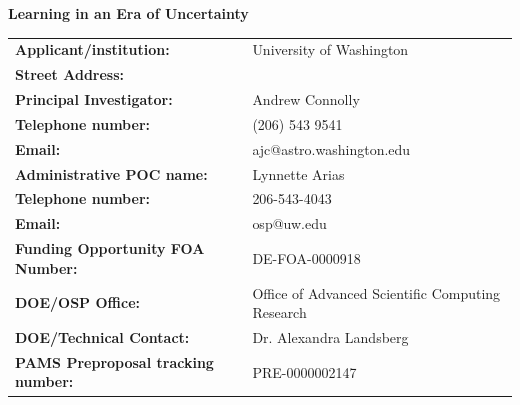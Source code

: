 \documentclass[prd,nofootbib,floatfix,11pt,tightenlines]{revtex4}
\begin{document}
 

\begin{center}
{\bf \Large Learning in an Era of Uncertainty}
\end{center}

\vspace{1cm}

\noindent
\begin{tabular}{ll}
{\bf Applicant/institution: } & University of Washington\\
{\bf Street Address: } & \\
{\bf Principal Investigator: } &Andrew Connolly \\
{\bf Telephone number: } & (206) 543 9541 \\
{\bf Email: } & ajc@astro.washington.edu \\
{\bf Administrative POC name:} & Lynnette Arias\\
{\bf Telephone number:} & 206-543-4043\\
{\bf Email:} & osp@uw.edu\\
{\bf Funding Opportunity FOA Number:} & DE-FOA-0000918 \\
{\bf DOE/OSP Office: } & Office of Advanced Scientific Computing Research \\
{\bf DOE/Technical Contact: } & Dr. Alexandra Landsberg \\
{\bf PAMS Preproposal tracking number: } & PRE-0000002147 \\
\end{tabular}

\end{document}
